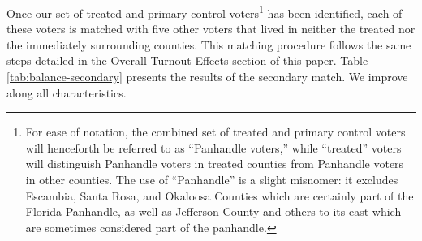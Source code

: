\documentclass[
  12pt,
]{article}
\begin{document}
Once our set of treated and primary control voters\footnote{For ease of notation, the combined set of treated and primary control voters will henceforth be referred to as ``Panhandle voters,'' while ``treated'' voters will distinguish Panhandle voters in treated counties from Panhandle voters in other counties. The use of ``Panhandle'' is a slight misnomer: it excludes Escambia, Santa Rosa, and Okaloosa Counties which are certainly part of the Florida Panhandle, as well as Jefferson County and others to its east which are sometimes considered part of the panhandle.} has been identified, each of these voters is matched with five other voters that lived in neither the treated nor the immediately surrounding counties. This matching procedure follows the same steps detailed in the Overall Turnout Effects section of this paper. Table \ref{tab:balance-secondary} presents the results of the secondary match. We improve along all characteristics.

\begin{singlespace}
\begin{table}[H]

\caption{\label{tab:balance-tab-ll2}\label{tab:balance-secondary} Balance Table for Secondary Match}
\centering
{}
\end{table}
\end{singlespace}
\end{document}
